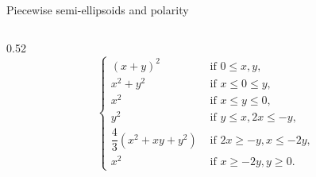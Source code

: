 \documentclass[9pt,notes=hide]{beamer}
\begin{document}
\begin{frame}{Piecewise semi-ellipsoids and polarity}
\begin{columns}
\begin{column}{0.52\textwidth}
\begin{equation*}
        \begin{cases}
          (x + y)^2 & \text{ if } 0 \le x, y,\\
          x^2 + y^2 & \text{ if } x \le 0 \le y,\\
          x^2 & \text{ if } x \le y \le 0,\\
          y^2 & \text{ if } y \le x, 2x \le -y,\\
          \dfrac{4}{3}(x^2 + xy + y^2) & \text{ if } 2x \ge -y, x \le -2y,\\
          x^2 & \text{ if } x \ge -2y, y \ge 0.
        \end{cases}
      \end{equation*}
    \end{column}
  \end{columns}
\end{frame}
\end{document}
